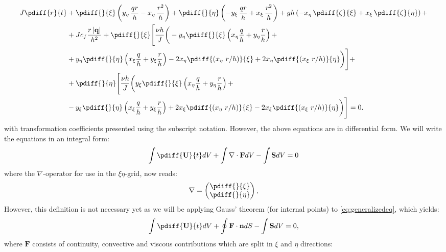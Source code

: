 	\begin{align}\label{CurviYmom_Expanded}
		\begin{aligned}
			J \pdiff{r}{t}
			&+ \pdiff{}{\xi} \left( y_{\eta}\, \frac{q r}{h} - x_{\eta}\, \frac{r^2}{h} \right)
			+ \pdiff{}{\eta} \left( -y_{\xi}\, \frac{q r}{h} + x_{\xi}\, \frac{r^2}{h} \right)
			+ g h \left( -x_{\eta}\, \pdiff{\zeta}{\xi} + x_{\xi}\, \pdiff{\zeta}{\eta} \right) +
            \\
			&+ J c_f \frac{r\, |\mathbf{q}|}{h^2}
			+  \pdiff{}{\xi} \Bigg[\frac{\nu h}{J} \bigg(
			-y_{\eta} \pdiff{}{\xi} \left(
			x_{\eta} \frac{q}{h} + y_{\eta} \frac{r}{h} \right) + \\
			&+ y_{\eta} \pdiff{}{\eta} \left(
			x_{\xi} \frac{q}{h} + y_{\xi} \frac{r}{h}  \right)
			- 2 x_{\eta} \pdiff{(x_{\eta}\ r/h)}{\xi}
			+ 2 x_{\eta}  \pdiff{(x_{\xi}\ r/h)}{\eta} \bigg) \Bigg] +
            \\
			&+  \pdiff{}{\eta} \Bigg[\frac{\nu h}{J} \bigg(
			y_{\xi} \pdiff{}{\xi} \left(x_{\eta} \frac{q}{h}
			+ y_{\eta} \frac{r}{h} \right) + \\
			&- y_{\xi} \pdiff{}{\eta} \left( x_{\xi} \frac{q}{h} +  y_{\xi} \frac{r}{h} \right)
			+ 2 x_{\xi} \pdiff{(x_{\eta}\ r/h)}{\xi}
			- 2 x_{\xi} \pdiff{(x_{\xi}\ r/h)}{\eta} \bigg) \Bigg] = 0.
		\end{aligned}
	\end{align}
%
with transformation coefficients presented using the subscript notation.
However, the above equations are in differential form.
We will write the equations in an integral form:
%
\begin{align}\label{eq:generalizedeq}
	\int \pdiff{\mathbf{U}}{t}dV + \int \nabla \cdot \mathbf{F} dV - \int \mathbf{S}dV = 0
\end{align}
%
where the $\nabla$-operator for use in the $\xi\eta$-grid, now reads:
%
\begin{align}
	\nabla=
	\begin{pmatrix}
		\pdiff{}{\xi}\\
		\pdiff{}{\eta}
	\end{pmatrix},
\end{align}
%
However, this definition is not necessary yet as we will be applying Gauss' theorem (for internal points) to \autoref{eq:generalizedeq}, which yields:
%
\begin{align}
	\int \pdiff{\mathbf{U}}{t}dV + \oint \mathbf{F}\cdot \mathbf{n}dS - \int \mathbf{S}dV = 0,
\end{align}
%
where $\mathbf{F}$ consists of continuity, convective and viscous contributions which are split in $\xi$ and $\eta$ directions:

